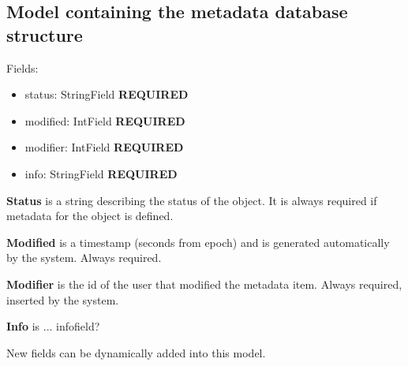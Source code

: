 \documentclass[letterpaper,10pt,english]{sphinxmanual}
\begin{document}
\label{codedoc/locdoc:module-lbd_backend.LBD_REST_locationdata.models}

\subsection{Model containing the metadata database structure}
\label{codedoc/locdoc:module-LocationdataREST.models}\label{codedoc/locdoc:model-containing-the-metadata-database-structure}

\begin{fulllineitems}
\label{codedoc/locdoc:lbd_backend.LBD_REST_locationdata.models.MetaData}
Fields:
\begin{itemize}
\item {} 
status: StringField \textbf{REQUIRED}

\item {} 
modified: IntField \textbf{REQUIRED}

\item {} 
modifier: IntField \textbf{REQUIRED}

\item {} 
info: StringField \textbf{REQUIRED}

\end{itemize}

\textbf{Status} is a string describing the status of the object. It is always required if metadata for the
object is defined.

\textbf{Modified} is a timestamp (seconds from epoch) and is generated automatically by the system. Always required.

\textbf{Modifier} is the id of the user that modified the metadata item. Always required, inserted by the system.

\textbf{Info} is ... infofield?

New fields can be dynamically added into this model.

\end{fulllineitems}

\end{document}
